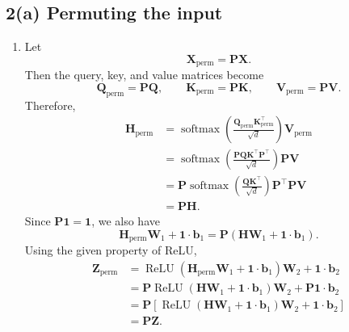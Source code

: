 

\begin{answer}
\section*{2(a) Permuting the input}
\begin{enumerate}
    \item Let
    \[
        \mathbf{X}_{\text{perm}} = \mathbf{P}\mathbf{X}.
    \]
    Then the query, key, and value matrices become
    \[
        \mathbf{Q}_{\text{perm}} = \mathbf{P}\mathbf{Q},
        \qquad
        \mathbf{K}_{\text{perm}} = \mathbf{P}\mathbf{K},
        \qquad
        \mathbf{V}_{\text{perm}} = \mathbf{P}\mathbf{V}.
    \]
    Therefore,
    \begin{align*}
        \mathbf{H}_{\text{perm}}
        &= \operatorname{softmax}\left(
            \frac{\mathbf{Q}_{\text{perm}}\mathbf{K}_{\text{perm}}^\top}{\sqrt{d}}
        \right)\mathbf{V}_{\text{perm}} \\
        &= \operatorname{softmax}\left(
            \frac{\mathbf{P}\mathbf{Q}\mathbf{K}^\top\mathbf{P}^\top}{\sqrt{d}}
        \right)\mathbf{P}\mathbf{V} \\
        &= \mathbf{P}
        \operatorname{softmax}\left(
            \frac{\mathbf{Q}\mathbf{K}^\top}{\sqrt{d}}
        \right)
        \mathbf{P}^\top\mathbf{P}\mathbf{V} \\
        &= \mathbf{P}\mathbf{H}.
    \end{align*}
    Since $\mathbf{P}\mathbf{1} = \mathbf{1}$, we also have
    \[
        \mathbf{H}_{\text{perm}}\mathbf{W}_1 + \mathbf{1}\cdot\mathbf{b}_1
        =
        \mathbf{P}
        \left(\mathbf{H}\mathbf{W}_1 + \mathbf{1}\cdot\mathbf{b}_1\right).
    \]
    Using the given property of ReLU,
    \begin{align*}
        \mathbf{Z}_{\text{perm}}
        &= \operatorname{ReLU}\left(
            \mathbf{H}_{\text{perm}}\mathbf{W}_1 + \mathbf{1}\cdot\mathbf{b}_1
        \right)\mathbf{W}_2
        + \mathbf{1}\cdot\mathbf{b}_2 \\
        &= \mathbf{P}
        \operatorname{ReLU}\left(
            \mathbf{H}\mathbf{W}_1 + \mathbf{1}\cdot\mathbf{b}_1
        \right)\mathbf{W}_2
        + \mathbf{P}\mathbf{1}\cdot\mathbf{b}_2 \\
        &= \mathbf{P}
        \left[
            \operatorname{ReLU}\left(
                \mathbf{H}\mathbf{W}_1 + \mathbf{1}\cdot\mathbf{b}_1
            \right)\mathbf{W}_2
            + \mathbf{1}\cdot\mathbf{b}_2
        \right] \\
        &= \mathbf{P}\mathbf{Z}.
    \end{align*}


\end{enumerate}
\end{answer}
